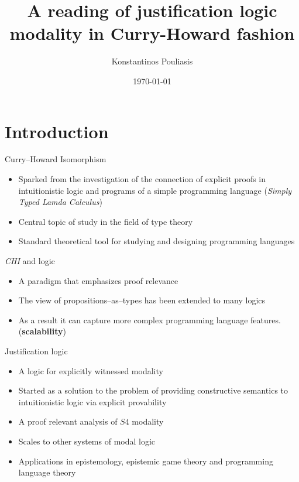 \documentclass{beamer}
\title{A reading of justification logic modality in Curry-Howard fashion}
\date{\today}
\author{Konstantinos Pouliasis}
\institute{CUNY, Graduate Center}
\begin{document}
    \maketitle
    \section{Introduction}
    \begin{frame}{Curry--Howard Isomorphism}
      \begin{itemize}
\item[] Sparked from the investigation of the connection of 
explicit proofs in intuitionistic logic and 
programs of a simple programming language (\emph{Simply Typed Lamda Calculus})

\item[] Central topic of study in the field of type theory

\item[] Standard theoretical tool for studying and designing programming languages
      \end{itemize}
\end{frame}
\begin{frame}{\emph{CHI} and logic}
  \begin{itemize}

  \item[] A  paradigm that emphasizes proof relevance
  \item[] The view of propositions--as--types has been extended to many logics
  \item[] As a result it can capture more complex programming language features. 
   (\textbf{scalability})
  \end{itemize}
\end{frame}
\begin{frame}{Justification logic}
  \begin{itemize}
    \item[] A logic for explicitly witnessed modality
    \item[] Started as a solution to the problem  of providing 
    constructive semantics to intuitionistic logic via explicit provability
    \item [] A proof relevant analysis of $S4$ modality 
    \item[] Scales to other systems of modal logic
    \item[] Applications in epistemology, epistemic game theory and programming language theory
  \end{itemize}
\end{frame}
\end{document}
